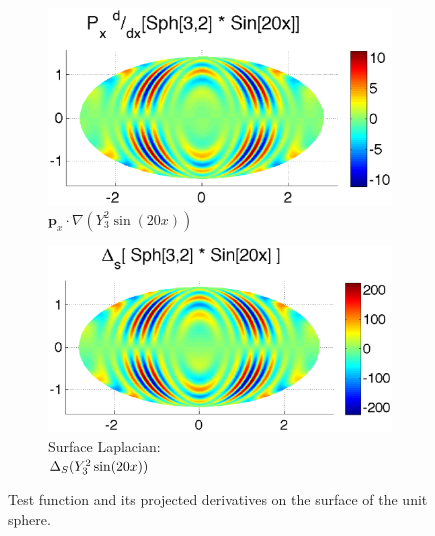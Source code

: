 \begin{figure}
\begin{center}
	\begin{subfigure}[t]{0.48\textwidth}
		\centering
	\includegraphics[width=1.0\textwidth]{../figures/appendices/direct_vs_indirect_weights/compare_weight_generation/xsfc_vs_xsfc_alt_on_sph32_times_sine_20x/pdx_sph32_times_sin20x.eps}
	\caption{$\mathbf{p}_{x} \cdot \nabla ( Y_{3}^{2} \sin(20 x))$ }
	\end{subfigure}
	\begin{subfigure}[t]{0.48\textwidth}
		\centering
	\includegraphics[width=1.0\textwidth]{../figures/appendices/direct_vs_indirect_weights/compare_weight_generation/lsfc_vs_px_grad_dot_px_grad/lsfc_sph32_times_sin20x.eps}
	\caption{Surface Laplacian: \\ $\Delta_S ( Y_{3}^{2} \sin(20 x) )$  }
	\end{subfigure}
	\caption{Test function and its projected derivatives on the surface of the unit sphere. }
	\end{center}
\end{figure}

